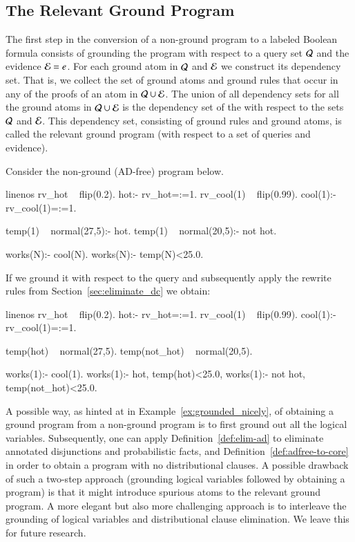 \subsection{The Relevant Ground Program}

The first step in the conversion of a non-ground \dcproblogsty program to a labeled  Boolean formula consists of grounding the program with respect to a query set $\mathcal{Q}$ and the evidence $\mathcal{E}=e$.
For each ground atom in $\mathcal{Q}$ and $\mathcal{E}$ we construct its dependency set. That is, we collect the set of ground atoms and ground rules that occur in any of the proofs of an atom in $\mathcal{Q}\cup \mathcal{E}$. The union of all dependency sets for all the ground atoms in $\mathcal{Q}\cup\mathcal{E}$ is the dependency set of the \dcproblogsty with respect to the sets $\mathcal{Q}$ and $\mathcal{E}$. This dependency set, consisting of ground rules and ground atoms, is called the relevant ground program (with respect to a set of queries and evidence).

\begin{example}
	\label{ex:grounded_nicely}
	Consider the non-ground (AD-free) \dcproblogsty program below.     
	\begin{problog*}{linenos}
rv_hot ~ flip(0.2).
hot:- rv_hot=:=1.
rv_cool(1) ~ flip(0.99).
cool(1):- rv_cool(1)=:=1.

temp(1) ~ normal(27,5):- hot.
temp(1) ~ normal(20,5):- not hot.

works(N):- cool(N).
works(N):- temp(N)<25.0.
	\end{problog*}
If we ground it with respect to the query  and subsequently apply the rewrite rules from Section~\ref{sec:eliminate_dc} we obtain:
	\begin{problog*}{linenos}
rv_hot ~ flip(0.2). 
hot:- rv_hot=:=1.
rv_cool(1) ~ flip(0.99).
cool(1):- rv_cool(1)=:=1.

temp(hot) ~ normal(27,5).
temp(not_hot) ~ normal(20,5).

works(1):- cool(1).
works(1):- hot, temp(hot)<25.0,
works(1):- not hot, temp(not_hot)<25.0.
	\end{problog*}
\end{example}

A possible way, as hinted at in Example~\ref{ex:grounded_nicely}, of obtaining a ground \dfplpsty program from a non-ground \dcproblogsty program is to first ground out all the logical variables. Subsequently, one can apply Definition~\ref{def:elim-ad} to eliminate annotated disjunctions and probabilistic facts, and Definition~\ref{def:adfree-to-core} in order to obtain a \dfplpsty program with no distributional clauses.
A possible drawback of such a two-step approach (grounding logical variables followed by obtaining a \dcproblogsty program) is that it might introduce spurious atoms to the relevant ground program. A more elegant but also more challenging approach is to interleave the grounding of logical variables and distributional clause elimination. We leave this for future research.


